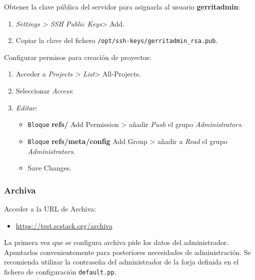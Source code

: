 \par Obtener la clave pública del servidor para asignarla al usuario \textbf{gerritadmin}:

\begin{enumerate}
\item \emph{Settings \textgreater{} SSH Public Keys}\textgreater{} Add.
\item Copiar la clave del fichero \texttt{/opt/ssh-keys/gerritadmin\_rsa.pub}.
\end{enumerate}

\par Configurar permisos para creación de proyectos:

\begin{enumerate}
    \item Acceder a \emph{Projects \textgreater{} List}\textgreater{} All-Projects.
    \item Seleccionar \emph{Access}:
    \item \emph{Editar}:
    \begin{itemize}
	    \item \texttt{Bloque} \textbf{refs/} Add Permission \textgreater{} añadir \emph{Push} el grupo \emph{Administrators}.
	    \item \texttt{Bloque} \textbf{refs/meta/config} Add Group \textgreater{} añadir a \emph{Read} el grupo \emph{Administrators}.
	    \item Save Changes.
    \end{itemize}
\end{enumerate}


\subsubsection{Archiva}
\label{subs:conf-archiva}

\par Acceder a la URL de Archiva:

\begin{itemize}
    \item \url{https://test.scstack.org/archiva}
\end{itemize}

\par La primera vez que se configura archiva pide los datos del administrador. Apuntarlos convenientemente para posteriores necesidades de administración. Se recomienda utilizar la contraseña del administrador de la forja definida en el fichero de configuración \texttt{default.pp}.

